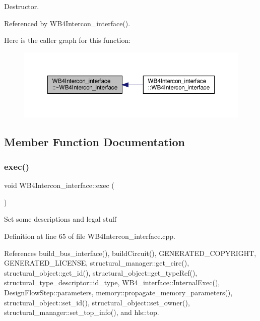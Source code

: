 Destructor. 



Referenced by W\+B4\+Intercon\+\_\+interface().

Here is the caller graph for this function\+:
\nopagebreak
\begin{figure}[H]
\begin{center}
\leavevmode
\includegraphics[width=350pt]{de/d3d/classWB4Intercon__interface_a474d261542b25f923f4cbfac6a74e074_icgraph}
\end{center}
\end{figure}


\subsection{Member Function Documentation}
\mbox{\label{classWB4Intercon__interface_a3e1e0b77dcc355b24a19bfe32de05610}} 
\subsubsection{\texorpdfstring{exec()}{exec()}}
{\footnotesize\ttfamily void W\+B4\+Intercon\+\_\+interface\+::exec (\begin{DoxyParamCaption}{ }\end{DoxyParamCaption})\hspace{0.3cm}{\ttfamily [virtual]}}

Set some descriptions and legal stuff 

Definition at line 65 of file W\+B4\+Intercon\+\_\+interface.\+cpp.



References build\+\_\+bus\+\_\+interface(), build\+Circuit(), G\+E\+N\+E\+R\+A\+T\+E\+D\+\_\+\+C\+O\+P\+Y\+R\+I\+G\+HT, G\+E\+N\+E\+R\+A\+T\+E\+D\+\_\+\+L\+I\+C\+E\+N\+SE, structural\+\_\+manager\+::get\+\_\+circ(), structural\+\_\+object\+::get\+\_\+id(), structural\+\_\+object\+::get\+\_\+type\+Ref(), structural\+\_\+type\+\_\+descriptor\+::id\+\_\+type, W\+B4\+\_\+interface\+::\+Internal\+Exec(), Design\+Flow\+Step\+::parameters, memory\+::propagate\+\_\+memory\+\_\+parameters(), structural\+\_\+object\+::set\+\_\+id(), structural\+\_\+object\+::set\+\_\+owner(), structural\+\_\+manager\+::set\+\_\+top\+\_\+info(), and hls\+::top.

